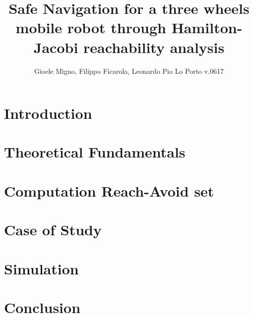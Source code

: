 \documentclass[conference]{IEEEtran}
\begin{document}
    
    \title{Safe Navigation for a three wheels mobile robot through Hamilton-Jacobi reachability analysis}
    \author{Gioele Migno, Filippo Ficarola, Leonardo Pio Lo Porto \LARGE v.0617 }
    \maketitle
    
    
    
    \section{Introduction}
        \label{introduction}
        
    
    \section{Theoretical Fundamentals}
        \label{theoretical_fundamentals}
        
    
    \section{Computation Reach-Avoid set}
        \label{comp_ras}
        

    \section{Case of Study}
        \label{case_of_study}
        

    \section{Simulation}
        \label{simulation}
        
        
    \section{Conclusion}
        

    \clearpage
    \appendix
        

    \newpage
    
\end{document}
